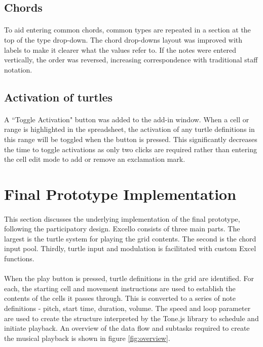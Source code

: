 \subsection{Chords}

\paragraph{} To aid entering common chords, common types are repeated in a section at the top of the type drop-down. The chord drop-downs layout was improved with labels to make it clearer what the values refer to. If the notes were entered vertically, the order was reversed, increasing correspondence with traditional staff notation.

\subsection{Activation of turtles}

\paragraph{} A ``Toggle Activation" button was added to the add-in window. When a cell or range is highlighted in the spreadsheet, the activation of any turtle definitions in this range will be toggled when the button is pressed.  This significantly decreases the time to toggle activations as only two clicks are required rather than entering the cell edit mode to add or remove an exclamation mark.

\section{Final Prototype Implementation}

\paragraph{} This section discusses the underlying implementation of the final prototype, following the participatory design. Excello consists of three main parts. The largest is the turtle system for playing the grid contents. The second is the chord input pool. Thirdly, turtle input and modulation is facilitated with custom Excel functions.

\paragraph{} When the play button is pressed, turtle definitions in the grid are identified. For each, the starting cell and movement instructions are used to establish the contents of the cells it passes through. This is converted to a series of note definitions - pitch, start time, duration, volume. The speed and loop parameter are used to create the structure interpreted by the Tone.js library to schedule and initiate playback. An overview of the data flow and subtasks required to create the musical playback is shown in figure \ref{fig:overview}.

